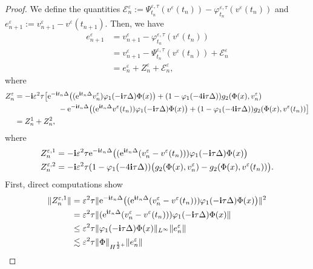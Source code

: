 \documentclass[a4paper]{amsart}
\begin{document}
\begin{proof}
   We define the quantities $\mathcal{E}^\varepsilon_n:=\Psi_{t_n}^{\varepsilon,\tau}(v^\varepsilon(t_n))-\varphi_{t_n}^{\varepsilon,\tau}(v^\varepsilon(t_n))$ and $e^\varepsilon_{n+1}:=v^\varepsilon_{n+1}-v^\varepsilon(t_{n+1})$. Then, we have
\begin{align*}
e^\varepsilon_{n+1} &= v^\varepsilon_{n+1}-\varphi_{t_{n}}^{\varepsilon,\tau} (v^\varepsilon(t_n))\\
&=v^\varepsilon_{n+1}-\Psi_{t_n}^{\varepsilon,\tau} (v^\varepsilon(t_n))+\mathcal{E}^\varepsilon_n\\
&=e^\varepsilon_n+Z^\varepsilon_n+\mathcal{E}^\varepsilon_n,
\end{align*}
where
\begin{align*}
    Z^\varepsilon_n&=-{\bf i}\varepsilon^2\tau\big[{\rm e}^{-{\bf i}t_n\Delta }\big(({\rm e}^{{\bf i}t_n\Delta }v^\varepsilon_n)\varphi_1(-{\bf i}\tau \Delta)\Phi(x)\big)+ (1-\varphi_1(-4{\bf i}\tau \Delta))g_2(\Phi(x),v^\varepsilon_n)\\
    &\hspace{2cm}-{\rm e}^{-{\bf i}t_n\Delta }\big(({\rm e}^{{\bf i}t_n\Delta }v^\varepsilon(t_n))\varphi_1(-{\bf i}\tau \Delta)\Phi(x)\big)+ (1-\varphi_1(-4{\bf i}\tau \Delta))g_2(\Phi(x),v^\varepsilon(t_n))\big]\\
    &= Z^1_{n}+Z^2_{n},
\end{align*}
where
\begin{align*}
&Z_n^{\varepsilon,1}=-{\bf i}\varepsilon^2\tau {\rm e}^{-{\bf i}t_n\Delta}\big(({\rm e}^{{\bf i}t_n \Delta}(v^\varepsilon_n-v^\varepsilon(t_n)))\varphi_1(-{\bf i}\tau\Delta)\Phi(x)\big)\\
&Z_n^{\varepsilon,2}=-{\bf i}\varepsilon^2\tau (1-\varphi_1(-4{\bf i}\tau \Delta))\big(g_2(\Phi(x),v^\varepsilon_n)-g_2(\Phi(x),v^\varepsilon(t_n))\big).
\end{align*}
First, direct computations show 
\begin{align*}
\|Z_n^{\varepsilon,1}\| &= \varepsilon^{2} \tau \|{\rm e}^{-{\bf i}t_n\Delta}\big(({\rm e}^{{\bf i}t_n \Delta}(v^\varepsilon_n-v^\varepsilon(t_n)))\varphi_1(-{\bf i}\tau\Delta)\Phi(x)\big)\|^{2}\\
&=\varepsilon^2 \tau \|({\rm e}^{{\bf i}t_n \Delta}(v^\varepsilon_n-v^\varepsilon(t_n)))\varphi_1(-{\bf i}\tau\Delta)\Phi(x)\|\\
&\le \varepsilon^{2} \tau \|\varphi_1(-{\bf i}\tau\Delta)\Phi(x)\|_{L^\infty}\|e^\varepsilon_n\|\\
&\lesssim \varepsilon^{2} \tau  \|\Phi\|_{H^{\frac{1}{2}+}}\|e^\varepsilon_n\|

\end{align*}
\end{proof}
\end{document}
